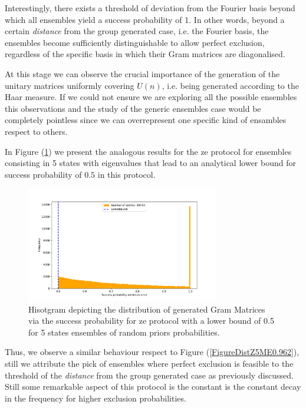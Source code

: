 \documentclass[12pt,letterpaper]{article}
\begin{document}
Interestingly, there exists a threshold of deviation from the Fourier basis beyond which all ensembles yield a success probability of 1. In other words, beyond a certain \emph{distance} from the group generated case, i.e. the Fourier basis, the ensembles become sufficiently distinguishable to allow perfect exclusion, regardless of the specific basis in which their Gram matrices are diagonalised.

At this stage we can observe the crucial importance of the generation of the unitary matrices uniformly covering  $U(n)$, i.e. being generated according to the Haar measure. If we could not ensure we are exploring all the possible ensembles this observations and the study of the generic ensembles case would be completely pointless since we can overrepresent one specific kind of ensambles respect to others.

In Figure (\ref{FigureDistZ5ZE0.5}) we present the analogous results for the \gls{ze} protocol for ensembles consisting in 5 states with eigenvalues that lead to an analytical lower bound for success probability of $0.5$ in this protocol.

\begin{figure}[H]
	\centering
	\includegraphics[width=0.75\textwidth, trim={1.0cm 0.3cm 2.4cm 1.5cm}, clip]{../Plots/ExclusionZeroErrorRandomDistributionZ3Prob0.5.pdf}
	\caption{Hisotgram depicting the distribution of generated Gram Matrices via the success probability for \gls{ze} protocol with a lower bound of 0.5 for 5 states ensembles of random priors probabilities.}
	\label{FigureDistZ5ZE0.5}
\end{figure}

Thus, we observe a similar behaviour respect to Figure (\ref{FigureDistZ5ME0.962}), still we attribute the pick of ensembles where perfect exclusion is feasible to the threshold of the \emph{distance} from the group generated case as previously discussed. Still some remarkable aspect of this protocol is the constant is the constant decay in the frequency for higher exclusion probabilities.
\end{document}
